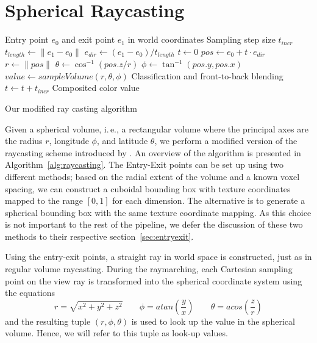 \documentclass{egpubl}
\begin{document}
\section{Spherical Raycasting}
\label{sec:spherical}
\begin{algorithm}
\begin{algorithmic}[1]
\REQUIRE Entry point $e_0$ and exit point $e_1$ in world coordinates
\REQUIRE Sampling step size $t_{incr}$
\STATE $t_{length} \gets \| e_1 - e_0 \|$
\STATE $e_{dir} \gets \left( e_1 - e_0 \right) / t_{length}$
\STATE $t \gets 0$
	\STATE $pos \gets e_0 + t \cdot e_{dir}$
	\STATE $r \gets \| pos \|$
	\STATE $\theta \gets \cos^{-1}(pos.z / r)$
	\STATE $\phi \gets \tan^{-1}(pos.y, pos.x)$
	\STATE $value \gets sampleVolume(r, \theta , \phi)$
	\STATE Classification and front-to-back blending
	\STATE $t \gets t + t_{incr}$
\ENDWHILE
\ENSURE Composited color value

\end{algorithmic}
\caption{Our modified ray casting algorithm}
\label{alg:raycasting}
\end{algorithm}

Given a spherical volume, i.\,e., a rectangular volume where the principal axes are the radius $r$, longitude $\phi$, and latitude $\theta$, we perform a modified version of the raycasting scheme introduced by \cite{Kr}. An overview of the algorithm is presented in Algorithm~\ref{alg:raycasting}. The Entry-Exit points can be set up using two different methods; based on the radial extent of the volume and a known voxel spacing, we can construct a cuboidal bounding box with texture coordinates mapped to the range $[0,1]$ for each dimension. The alternative is to generate a spherical bounding box with the same texture coordinate mapping. As this choice is not important to the rest of the pipeline, we defer the discussion of these two methods to their respective section~\ref{sec:entryexit}.

Using the entry-exit points, a straight ray in world space is constructed, just as in regular volume raycasting. During the raymarching, each Cartesian sampling point on the view ray is transformed into the spherical coordinate system using the equations
$$r = \sqrt{x^2 + y^2 + z^2} \; \; \; \; \; \; \; \phi = atan\left(\frac{y}{x}\right) \; \; \; \; \; \; \; \theta = acos\left(\frac{z}{r}\right)$$
and the resulting tuple $(r, \phi, \theta)$ is used to look up the value in the spherical volume. Hence, we will refer to this tuple as look-up values.
\end{document}
